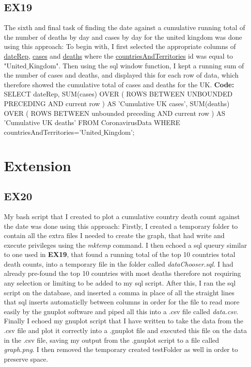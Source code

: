 \documentclass[10pt]{article}
\begin{document}
\subsection{EX19}
The sixth and final task of finding the date against a cumulative running total of the number of deaths by day and cases by day for the united kingdom was done using this approach:
To begin with, I first selected the appropriate columns of \underline{dateRep}, \underline{cases} and \underline{deaths} where the \underline{countriesAndTerritories} id was equal to "United$\_$Kingdom". Then using the sql window function, I kept a running sum of the number of cases and deaths, and displayed this for each row of data, which therefore showed the cumulative total of cases and deaths for the UK. \textbf{Code:} \\
SELECT
    dateRep,
    SUM(cases) OVER (
        ROWS BETWEEN
            UNBOUNDED PRECEDING AND
            current row
        ) AS 'Cumulative UK cases',
    SUM(deaths) OVER (
        ROWS BETWEEN
            unbounded preceding AND
            current row
        ) AS 'Cumulative UK deaths'
FROM CoronavirusData WHERE countriesAndTerritories='United$\_$Kingdom';

\section{Extension}
\subsection{EX20}
My bash script that I created to plot a cumulative country death count against the date was done using this approach:
Firstly, I created a temporary folder to contain all the extra files I needed to create the graph, that had write and execute privileges using the \textit{mktemp} command. I then echoed a sql queury similar to one used in \textbf{EX19}, that found a running total of the top 10 countries total death counts, into a temporary file in the folder called \textit{dataChooser.sql}. I had already pre-found the top 10 countries with most deaths therefore not requiring any selection or limiting to be added to my sql script. After this, I ran the sql script on the database, and inserted a comma in place of all the straight lines that sql inserts automaticlly between columns in order for the file to read more easily by the gnuplot software and piped all this into a .csv file called \textit{data.csv}. Finally I echoed my gnuplot script that I have written to take the data from the .csv file and plot it correctly into a .gnuplot file and executed this file on the data in the .csv file, saving my output from the .gnuplot script to a file called \textit{graph.png}. I then removed the temporary created testFolder as well in order to preserve space.
\end{document}
